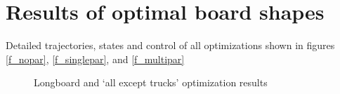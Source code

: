 \section*{Results of optimal board shapes}
Detailed trajectories, states and control of all optimizations shown in figures \ref{f_nopar}, \ref{f_singlepar}, and \ref{f_multipar}
\begin{figure}[b]
    \newline
    \label{f_longboard}
    \caption{Longboard and `all except trucks' optimization results}
\end{figure}


